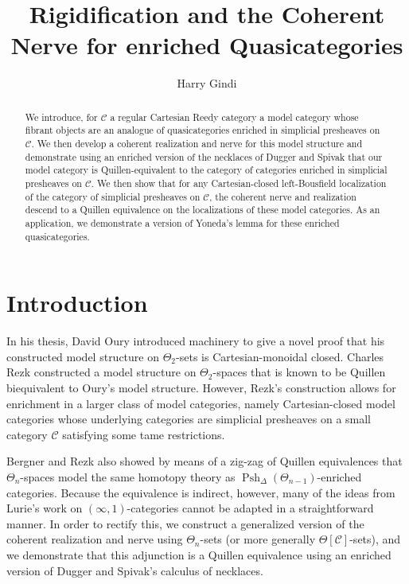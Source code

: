 \documentclass[leqno]{article}
\title{Rigidification and the Coherent Nerve for enriched Quasicategories}
\author{Harry Gindi}
\date{}
\numberwithin{equation}{subsection}
\theoremstyle{plain}   %
\theoremstyle{remark}
\theoremstyle{plain}
\DeclareMathOperator{\Psh}{Psh}
\providecommand{\C}{}
\renewcommand{\C}{\ensuremath{\mathcal{C}}}
\begin{document}
\maketitle

\begin{abstract}
	We introduce, for \(\C\) a regular Cartesian Reedy category a model category whose fibrant objects are an analogue of quasicategories enriched in simplicial presheaves on \(\C\).  We then develop a coherent realization and nerve for this model structure and demonstrate using an enriched version of the necklaces of Dugger and Spivak that our model category is Quillen-equivalent to the category of categories enriched in simplicial presheaves on \(\C\).  We then show that for any Cartesian-closed left-Bousfield localization of the category of simplicial presheaves on \(\C\), the coherent nerve and realization descend to a Quillen equivalence on the localizations of these model categories. As an application, we demonstrate a version of Yoneda's lemma for these enriched quasicategories.
\end{abstract}

\tableofcontents






\section*{Introduction}
In his thesis, David Oury introduced machinery to give a novel proof that his constructed model structure on \(\Theta_2\)-sets is Cartesian-monoidal closed. Charles Rezk constructed a model structure on \(\Theta_2\)-spaces that is known to be Quillen biequivalent to Oury's model structure.  However,  Rezk's construction allows for enrichment in a larger class of model categories, namely Cartesian-closed model categories whose underlying categories are simplicial presheaves on a small category \(\C\) satisfying some tame restrictions.

Bergner and Rezk also showed by means of a zig-zag of Quillen equivalences that \(\Theta_n\)-spaces model the same homotopy theory as \(\Psh_\Delta(\Theta_{n-1})\)-enriched categories.  Because the equivalence is indirect, however, many of the ideas from Lurie's work on \((\infty,1)\)-categories cannot be adapted in a straightforward manner.  In order to rectify this, we construct a generalized version of the coherent realization and nerve using \(\Theta_n\)-sets (or more generally \(\Theta[\C]\)-sets), and we demonstrate that this adjunction is a Quillen equivalence using an enriched version of Dugger and Spivak's calculus of necklaces. 
\end{document}
